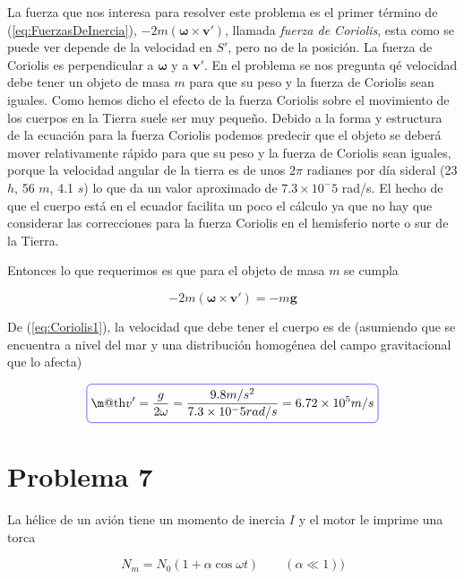 \documentclass[a4paper,10pt]{article}
\makeatletter
\numberwithin{equation}{section}
\newcommand*{\boxcolor}{blue}
\renewcommand{\boxed}[1]{\textcolor{\boxcolor}{%
\tikz[baseline={([yshift=-1ex]current bounding box.center)}] \node [rectangle, minimum width=1ex,rounded corners,draw] {\normalcolor\m@th$\displaystyle#1$};}}
\makeatother
\begin{document}
La fuerza que nos interesa para resolver este problema es el primer término de (\ref{eq:FuerzasDeInercia}), $- 2m(\mathbf{\omega} \times \mathbf{v'})$,
llamada \emph{fuerza de Coriolis}, esta como se puede ver depende de la velocidad en $S'$, pero no de la posición. La fuerza de Coriolis 
es perpendicular a $\mathbf{\omega}$ y a $\mathbf{v'}$. En el problema se nos pregunta qé velocidad debe tener un objeto de masa $m$ para que su peso 
y la fuerza de Coriolis sean iguales. Como hemos dicho el efecto de la fuerza Coriolis sobre el movimiento de los cuerpos en la Tierra 
suele ser muy pequeño. Debido a la forma y estructura de la ecuación para la fuerza Coriolis podemos predecir que el objeto se deberá mover 
relativamente rápido para que su peso y la fuerza de Coriolis sean iguales, porque la velocidad angular de la tierra es de unos $2\pi$ 
radianes por día sideral (23 $h$, 56 $m$, 4.1 $s$) lo que da un valor aproximado de $7.3 \times 10^-5$ rad/s. El hecho de que el
cuerpo está en el ecuador facilita un poco el cálculo ya que no hay que considerar las correcciones para la fuerza Coriolis en el
hemisferio norte o sur de la Tierra.

\vspace{.3cm}

Entonces lo que requerimos es que para el objeto de masa $m$ se cumpla

\begin{equation}
 - 2m(\mathbf{\omega} \times \mathbf{v'}) = - m \mathbf{g}
 \label{eq:Coriolis1}
\end{equation}

De (\ref{eq:Coriolis1}), la velocidad que debe tener el cuerpo es de (asumiendo que se encuentra a nivel del mar
y una distribución homogénea del campo gravitacional que lo afecta)

\begin{equation}
 \boxed{ v' = \frac{g}{2\omega} = \frac{9.8 m/s^2}{7.3 \times 10^-5 rad/s} = 6.72 \times 10^5 m/s}
\end{equation}


\vspace{.3cm}

\section{Problema 7}

La hélice de un avión tiene un momento de inercia $I$ y el motor le imprime una torca 

$$N_m = N_0 (1+\alpha \cos{\omega t}) \qquad (\alpha \ll 1))$$
\end{document}
